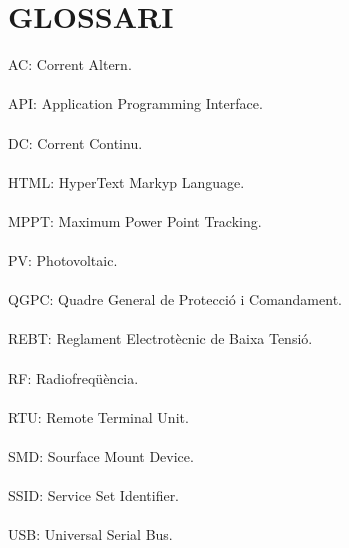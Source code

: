 \chapter{\uppercase{Glossari}}
AC: Corrent Altern. \\ \\
API: Application Programming Interface. \\ \\
DC: Corrent Continu. \\ \\
HTML: HyperText Markyp Language. \\ \\
MPPT: Maximum Power Point Tracking. \\ \\
PV: Photovoltaic. \\ \\
QGPC: Quadre General de Protecció i Comandament. \\ \\
REBT: Reglament Electrotècnic de Baixa Tensió. \\ \\
RF: Radiofreqüència. \\ \\
RTU: Remote Terminal Unit. \\ \\
SMD: Sourface Mount Device. \\ \\
SSID: Service Set Identifier. \\ \\
USB: Universal Serial Bus. \\ \\




\clearpage